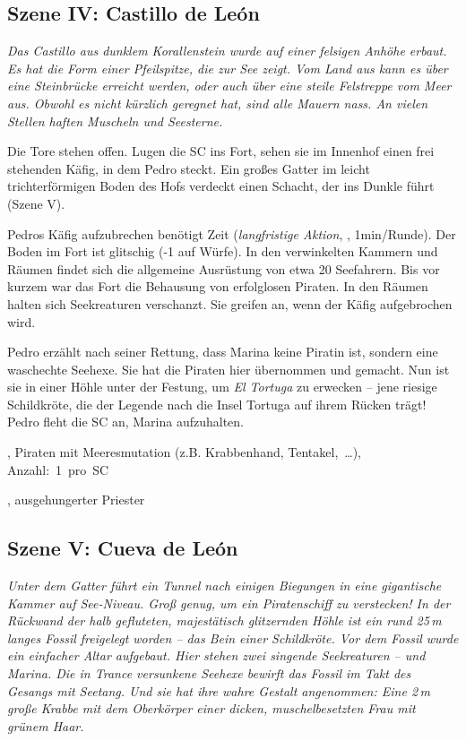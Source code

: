 {		\subsection{Szene IV: Castillo de León}

		\emph{Das Castillo aus dunklem Korallenstein wurde auf einer felsigen Anhöhe erbaut. Es hat die Form einer Pfeilspitze, die zur See zeigt. Vom Land aus kann es über eine Steinbrücke erreicht werden, oder auch über eine steile Felstreppe vom Meer aus. Obwohl es nicht kürzlich geregnet hat, sind alle Mauern nass. An vielen Stellen haften Muscheln und Seesterne.}

		Die Tore stehen offen. Lugen die SC ins Fort, sehen sie im Innenhof einen frei stehenden Käfig, in dem Pedro steckt. Ein großes Gatter im leicht trichterförmigen Boden des Hofs verdeckt einen Schacht, der ins Dunkle führt (Szene V).

		Pedros Käfig aufzubrechen benötigt Zeit (\emph{langfristige Aktion}, , 1min/Runde). Der Boden im Fort ist glitschig (-1 auf Würfe). In den verwinkelten Kammern und Räumen findet sich die allgemeine Ausrüstung von etwa 20 Seefahrern. Bis vor kurzem war das Fort die Behausung von erfolglosen Piraten. In den Räumen halten sich Seekreaturen verschanzt. Sie greifen an, wenn der Käfig aufgebrochen wird.

		Pedro erzählt nach seiner Rettung, dass Marina keine Piratin ist, sondern eine waschechte Seehexe. Sie hat die Piraten hier übernommen und  gemacht. Nun ist sie in einer Höhle unter der Festung, um \emph{El Tortuga} zu erwecken -- jene riesige Schildkröte, die der Legende nach die Insel Tortuga auf ihrem Rücken trägt! Pedro fleht die SC an, Marina aufzuhalten.

		, Piraten mit Meeresmutation (z.B. Krabbenhand, Tentakel,~\ldots), Anzahl:~1~pro~SC

		, ausgehungerter Priester

		\subsection{Szene V: Cueva de León}

		\emph{Unter dem Gatter führt ein Tunnel nach einigen Biegungen in eine gigantische Kammer auf See-Niveau. Groß genug, um ein Piratenschiff zu verstecken! In der Rückwand der halb gefluteten, majestätisch glitzernden Höhle ist ein rund 25\,m langes Fossil freigelegt worden -- das Bein einer Schildkröte. Vor dem Fossil wurde ein einfacher Altar aufgebaut. Hier stehen zwei singende Seekreaturen -- und Marina. Die in Trance versunkene Seehexe bewirft das Fossil im Takt des Gesangs mit Seetang. Und sie hat ihre wahre Gestalt angenommen: Eine 2\,m große Krabbe mit dem Oberkörper einer dicken, muschelbesetzten Frau mit grünem Haar.}

}
